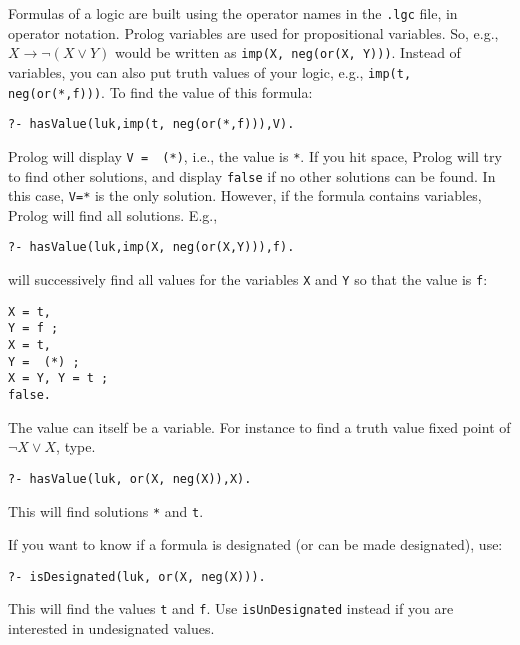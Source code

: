 \documentclass[
]{article}
\newcommand{\passthrough}[1]{#1}
\begin{document}
Formulas of a logic are built using the operator names in the
\passthrough{\lstinline!.lgc!} file, in operator notation. Prolog
variables are used for propositional variables. So, e.g.,
\(X \to \lnot(X \lor Y)\) would be written as
\passthrough{\lstinline!imp(X, neg(or(X, Y)))!}. Instead of variables,
you can also put truth values of your logic, e.g.,
\passthrough{\lstinline!imp(t, neg(or(*,f)))!}. To find the value of
this formula:

\begin{lstlisting}
?- hasValue(luk,imp(t, neg(or(*,f))),V).
\end{lstlisting}

Prolog will display \passthrough{\lstinline!V =  (*)!}, i.e., the value
is \passthrough{\lstinline!*!}. If you hit space, Prolog will try to
find other solutions, and display \passthrough{\lstinline!false!} if no
other solutions can be found. In this case,
\passthrough{\lstinline!V=*!} is the only solution. However, if the
formula contains variables, Prolog will find all solutions. E.g.,

\begin{lstlisting}
?- hasValue(luk,imp(X, neg(or(X,Y))),f).
\end{lstlisting}

will successively find all values for the variables
\passthrough{\lstinline!X!} and \passthrough{\lstinline!Y!} so that the
value is \passthrough{\lstinline!f!}:

\begin{lstlisting}
X = t,
Y = f ;
X = t,
Y =  (*) ;
X = Y, Y = t ;
false.
\end{lstlisting}

The value can itself be a variable. For instance to find a truth value
fixed point of \(\lnot X \lor X\), type.

\begin{lstlisting}
?- hasValue(luk, or(X, neg(X)),X).
\end{lstlisting}

This will find solutions \passthrough{\lstinline!*!} and
\passthrough{\lstinline!t!}.

If you want to know if a formula is designated (or can be made
designated), use:

\begin{lstlisting}
?- isDesignated(luk, or(X, neg(X))).
\end{lstlisting}

This will find the values \passthrough{\lstinline!t!} and
\passthrough{\lstinline!f!}. Use
\passthrough{\lstinline!isUnDesignated!} instead if you are interested
in undesignated values.
\end{document}
